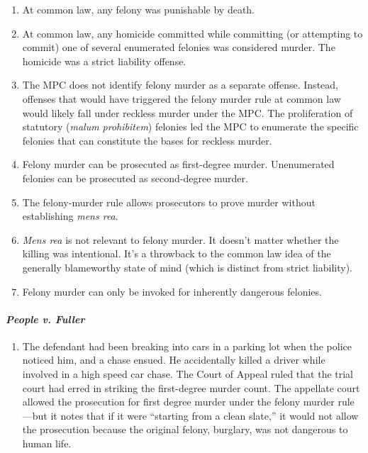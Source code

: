 \begin{enumerate}
    \item At common law, any felony was punishable by death.
    \item At common law, any homicide committed while committing (or attempting to commit) one of several enumerated felonies was considered murder. The homicide was a strict liability offense.
    \item The MPC does not identify felony murder as a separate offense. Instead, offenses that would have triggered the felony murder rule at common law would likely fall under reckless murder under the MPC. The proliferation of statutory (\emph{malum prohibitem}) felonies led the MPC to enumerate the specific felonies that can constitute the bases for reckless murder.
    \item Felony murder can be prosecuted as first-degree murder. Unenumerated felonies can be prosecuted as second-degree murder.
    \item The felony-murder rule allows prosecutors to prove murder without establishing \emph{mens rea}.
    \item \emph{Mens rea} is not relevant to felony murder. It doesn't matter whether the killing was intentional. It's a throwback to the common law idea of the generally blameworthy state of mind (which is distinct from strict liability).
    \item Felony murder can only be invoked for inherently dangerous felonies. %
\end{enumerate}

\paragraph{\emph{People v. Fuller}} 

\begin{enumerate}
    \item The defendant had been breaking into cars in a parking lot when the police noticed him, and a chase ensued. He accidentally killed a driver while involved in a high speed car chase. The Court of Appeal ruled that the trial court had erred in striking the first-degree murder count. The appellate court allowed the prosecution for first degree murder under the felony murder rule---but it notes that if it were ``starting from a clean slate,'' it would not allow the prosecution because the original felony, burglary, was not dangerous to human life.
\end{enumerate}

